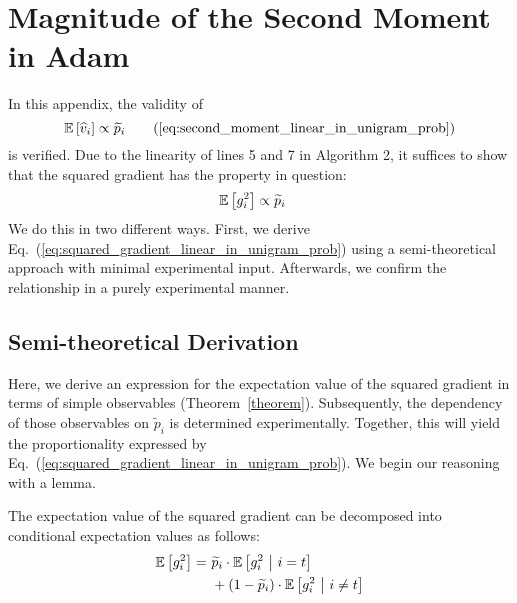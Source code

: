 \section{Magnitude of the Second Moment in Adam}

In this appendix, the validity of 
\begin{equation}
    \E \left[ \secondmomentshort \right] \propto \widetilde p_i
    \tag{\ref{eq:second_moment_linear_in_unigram_prob}}
\end{equation}
is verified.
Due to the linearity of lines 5 and 7 in Algorithm 2, it suffices to show that the squared gradient has the property in question:
\begin{align}
\mathbb{E} \left[ g_i^2 \right] &\propto \widetilde p_i
\label{eq:squared_gradient_linear_in_unigram_prob}
\end{align}
We do this in two different ways.
First, we derive Eq.~(\ref{eq:squared_gradient_linear_in_unigram_prob}) using a semi-theoretical approach with minimal experimental input.
Afterwards, we confirm the relationship in a purely experimental manner. %

\subsection{Semi-theoretical Derivation}
\label{app:second_moment_theory}

Here, we derive an expression for the expectation value of the squared gradient in terms of simple observables (Theorem~\ref{theorem}). Subsequently, the dependency of those observables on $\widetilde p_i$ is determined experimentally. Together, this will yield the proportionality expressed by Eq.~(\ref{eq:squared_gradient_linear_in_unigram_prob}).
We begin our reasoning with a lemma.

\begin{lemma}\label{lemma}
The expectation value of the squared gradient can be decomposed into conditional expectation values as follows:
\begin{align}
\mathbb{E} \left[ g_i^2 \right] =~ 
&\widetilde p_i \cdot \mathbb{E} \left[ g_i^2 ~\big|~ i=t \right] \nonumber \\
&+ (1 - \widetilde p_i) \cdot \mathbb{E} \left[ g_i^2 ~\big|~ i \neq t \right]
\label{eq:lemma1}
\end{align}
\end{lemma}

